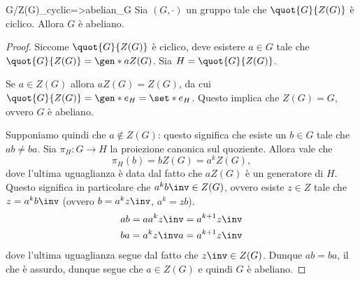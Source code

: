 \begin{proposition}{G/Z(G)_cyclic=>abelian_G}
    Sia $(G, \cdot)$ un gruppo tale che $\quot{G}{Z(G)}$ è ciclico. Allora $G$ è abeliano.
\end{proposition}
\begin{proof}
    Siccome $\quot{G}{Z(G)}$ è ciclico, deve esistere $a \in G$ tale che $\quot{G}{Z(G)} = \gen*{aZ(G)}$. Sia $H = \quot{G}{Z(G)}$.

    Se $a \in Z(G)$ allora $aZ(G) = Z(G)$, da cui $\quot{G}{Z(G)} = \gen*{e_H} = \set*{e_H}$. Questo implica che $Z(G) = G$, ovvero $G$ è abeliano.

    Supponiamo quindi che $a \notin Z(G)$: questo significa che esiste un $b \in G$ tale che $ab \neq ba$.
    Sia $\pi_H : G \to H$ la proiezione canonica sul quoziente. Allora vale che \[
        \pi_H(b) = bZ(G) = a^kZ(G),
    \] dove l'ultima uguaglianza è data dal fatto che $aZ(G)$ è un generatore di $H$. 
    Questo significa in particolare che $a^kb\inv \in Z(G)$, ovvero esiste $z \in Z$ tale che $z = a^kb\inv$ (ovvero $b = a^kz\inv$, $a^k=zb$).
    \begin{align*}
        ab = aa^kz\inv = a^{k+1}z\inv\\
        ba = a^kz\inv a = a^{k+1}z\inv 
    \end{align*} dove l'ultima uguaglianza segue dal fatto che $z\inv \in Z(G)$. Dunque $ab = ba$, il che è assurdo, dunque segue che $a \in Z(G)$ e quindi $G$ è abeliano.

\end{proof}
